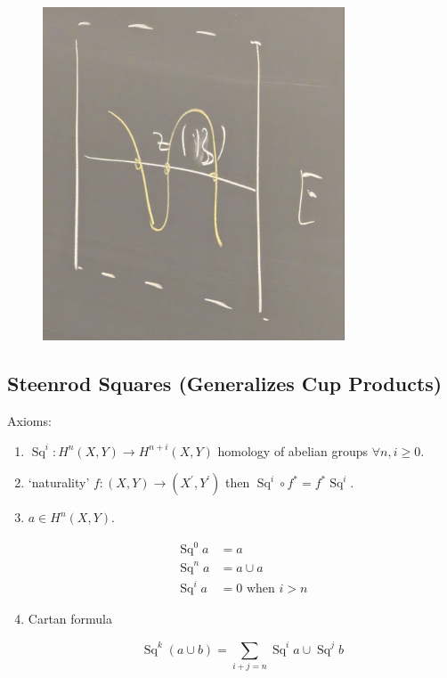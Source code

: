 \documentclass{article}
\theoremstyle{definition}
\begin{document}
    \begin{figure}[H]
        \centering
        \includegraphics[width=0.8\textwidth]{img/zerosection}
    \end{figure}    

    \subsection*{Steenrod Squares (Generalizes Cup Products)}

    Axioms:

    \begin{enumerate}[label=\arabic*)]
        \item \(\operatorname{Sq}^i: H^n(X,Y) \to H^{n+i}(X,Y) \) homology of abelian groups \(\forall n, i \geq 0\).
        \item `naturality' \(f: (X,Y) \to (X^{\prime} , Y^{\prime})\) then \(\operatorname{Sq}^i \circ f^{\ast} = f^{\ast} \operatorname{Sq}^i\).
        \item \(a\in H^n(X,Y)\).
        
        \begin{align*}
            \operatorname{Sq}^0 a &= a \\
            \operatorname{Sq}^n a &= a \cup a\\
            \operatorname{Sq}^i a &= 0 \text{ when } i > n
        \end{align*}

        \item Cartan formula
        
        \[
            \operatorname{Sq}^k(a\cup b) = \sum_{i+j = n} \operatorname{Sq}^i a \cup \operatorname{Sq}^j b
        \]
    \end{enumerate} 
\end{document}
